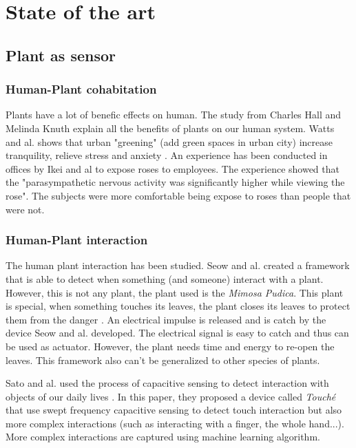 \section{State of the art}

\subsection{Plant as sensor}

\subsubsection{Human-Plant cohabitation}

Plants have a lot of benefic effects on human. The study from Charles Hall and Melinda Knuth \cite{hallUpdateLiteratureSupporting2019}
explain all the benefits of plants on our human system.
Watts and al. shows that urban "greening" (add green spaces in urban city)
increase tranquility, relieve stress and anxiety \cite{wattsEffectsGreeningUrban2017}.
An experience has been conducted in offices by Ikei and al \cite{ikeiPhysiologicalPsychologicalRelaxing2014}
to expose roses to employees. The experience showed that the "parasympathetic nervous activity was significantly higher while viewing the rose". The subjects were more comfortable
being expose to roses than people that were not.

\subsubsection{Human-Plant interaction}

The human plant interaction has been studied. Seow and al. \cite{seowPudicaFrameworkDesigning2022}
created a framework that is able to detect when something (and someone) interact with a plant.
However, this is not any plant, the plant used is the \textit{Mimosa Pudica}. This plant is special,
when something touches its leaves, the plant closes its leaves to protect them from the danger \cite{volkovMimosaPudicaElectrical2010}. 
An electrical impulse is released and is catch by the device Seow and al. developed. The electrical 
signal is easy to catch and thus can be used as actuator. However, the plant needs time and energy
to re-open the leaves. This framework also can't be generalized to other species of plants.

Sato and al. used the process of capacitive sensing to detect interaction with objects of our daily lives \cite{satoToucheEnhancingTouch2012}.
In this paper, they proposed a device called \textit{Touché} that use swept frequency capacitive sensing  to detect touch interaction 
but also more complex interactions (such as interacting with a finger, the whole hand...). More complex 
interactions are captured using machine learning algorithm.

